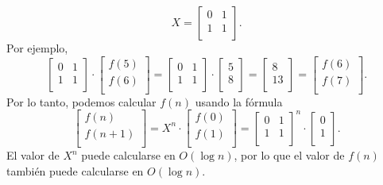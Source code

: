 \[ X =
    \begin{bmatrix}
        0 & 1 \\
        1 & 1 \\
    \end{bmatrix}.
\]
\noindent
Por ejemplo,
\[
    \begin{bmatrix}
        0 & 1 \\
        1 & 1 \\
    \end{bmatrix}
    \cdot
    \begin{bmatrix}
        f(5) \\
        f(6) \\
    \end{bmatrix}
    =
    \begin{bmatrix}
        0 & 1 \\
        1 & 1 \\
    \end{bmatrix}
    \cdot
    \begin{bmatrix}
        5 \\
        8 \\
    \end{bmatrix}
    =
    \begin{bmatrix}
        8  \\
        13 \\
    \end{bmatrix}
    =
    \begin{bmatrix}
        f(6) \\
        f(7) \\
    \end{bmatrix}.
\]
Por lo tanto, podemos calcular $f(n)$ usando la fórmula
\[
    \begin{bmatrix}
        f(n)   \\
        f(n+1) \\
    \end{bmatrix}
    =
    X^n \cdot
    \begin{bmatrix}
        f(0) \\
        f(1) \\
    \end{bmatrix}
    =
    \begin{bmatrix}
        0 & 1 \\
        1 & 1 \\
    \end{bmatrix}^n
    \cdot
    \begin{bmatrix}
        0 \\
        1 \\
    \end{bmatrix}.
\]
El valor de $X^n$ puede calcularse en $O(\log n)$, por lo que el valor de
$f(n)$ también puede calcularse en $O(\log n)$.

